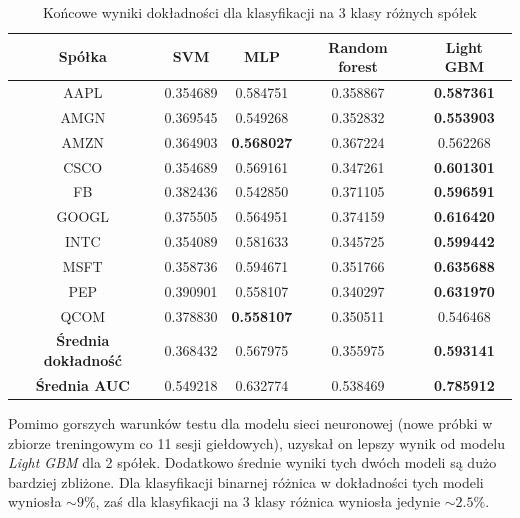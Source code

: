 \documentclass[a4paper, twoside, 11pt, openright]{article}
\begin{document}

\begin{table}[H]
    \centering
    \begin{tabular}{|c|c|c|c|c|}
    \hline
        \textbf{Spółka} & \textbf{SVM} &  \textbf{MLP}  &  \textbf{Random forest}  &  \textbf{Light GBM} \\ \hline
AAPL   &  0.354689 & 0.584751  & 0.358867 & \textbf{0.587361} \\ \hline
AMGN   &  0.369545 &  0.549268 & 0.352832 &  \textbf{0.553903} \\ \hline
AMZN   &  0.364903 & \textbf{0.568027} & 0.367224  & 0.562268 \\ \hline
CSCO   &  0.354689 &  0.569161 & 0.347261 &  \textbf{0.601301} \\ \hline
FB     &  0.382436 & 0.542850 & 0.371105 & \textbf{0.596591} \\ \hline
GOOGL  &  0.375505 &  0.564951 & 0.374159 & \textbf{0.616420} \\ \hline
INTC   &  0.354089 & 0.581633  & 0.345725 & \textbf{0.599442} \\ \hline
MSFT   &  0.358736 &   0.594671 & 0.351766 &  \textbf{0.635688} \\ \hline
PEP    &  0.390901 & 0.558107  & 0.340297 & \textbf{0.631970} \\ \hline
QCOM   &  0.378830 &  \textbf{0.558107} & 0.350511 & 0.546468 \\ \hline \hline
\textbf{Średnia dokładność} &  0.368432 & 0.567975 & 0.355975 & \textbf{0.593141} \\  \hline  
\textbf{Średnia AUC} &  0.549218 & 0.632774 & 0.538469 & \textbf{0.785912} \\  \hline
    \end{tabular}
    \caption{Końcowe wyniki dokładności dla klasyfikacji na 3 klasy różnych spółek}
    \label{tab:comparison_final_discrete}
\end{table}   

Pomimo gorszych warunków testu dla modelu sieci neuronowej (nowe próbki w zbiorze treningowym co 11 sesji giełdowych), uzyskał on lepszy wynik od modelu \textit{Light GBM} dla 2 spółek. Dodatkowo średnie wyniki tych dwóch modeli są dużo bardziej zbliżone. Dla klasyfikacji binarnej różnica w dokładności tych modeli wyniosła $\sim 9\%$, zaś dla klasyfikacji na 3 klasy różnica wyniosła jedynie $\sim 2.5\%$. 

\bigskip
\end{document}
